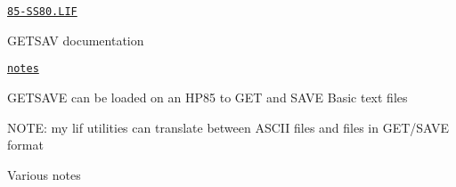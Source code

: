 \begin{DoxyItemize}
\begin{DoxyItemize}
\begin{DoxyItemize}
\begin{DoxyItemize}
\begin{DoxyItemize}
\item \href{sdcard/ASCII-files/85-SS80.LIF}{\tt 85-\/\+S\+S80.\+L\+IF}
\end{DoxyItemize}
\end{DoxyItemize}
\item G\+E\+T\+S\+AV documentation
\begin{DoxyItemize}
\item \href{sdcard/notes}{\tt notes}
\begin{DoxyItemize}
\item G\+E\+T\+S\+A\+VE can be loaded on an H\+P85 to G\+ET and S\+A\+VE Basic text files
\begin{DoxyItemize}
\item N\+O\+TE\+: my lif utilities can translate between A\+S\+C\+II files and files in G\+E\+T/\+S\+A\+VE format
\end{DoxyItemize}
\end{DoxyItemize}
\item Various notes 

 
\end{DoxyItemize}
\end{DoxyItemize}
\end{DoxyItemize}
\end{DoxyItemize}